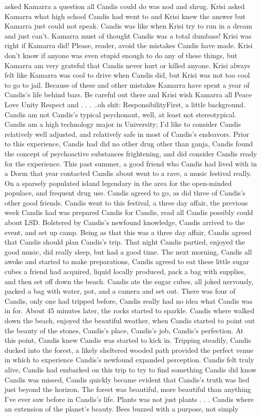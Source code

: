\documentclass[12pt]{book}
\begin{document}
asked Kamarra a question all Candis could do was nod and shrug. Krisi asked Kamarra what high school Candis had went to and Krisi knew the answer but Kamarra just could not speak. Candis was like when Krisi try to run in a dream and just can't. Kamarra must of thought Candis was a total dumbass! Krisi was right if Kamarra did! Please, reader, avoid the mistakes Candis have made. Krisi don't know if anyone was even stupid enough to do any of these things, but Kamarra am very grateful that Candis never hurt or killed anyone. Krisi always felt like Kamarra was cool to drive when Candis did, but Krisi was not too cool to go to jail. Because of these and other mistakes Kamarra have spent a year of Candis's life behind bars. Be careful out there and Krisi wish Kamarra all Peace Love Unity Respect and . . .  ..oh shit: ResponsibilityFirst, a little background. Candis am not Candis's typical psychonaut, well, at least not stereotypical. Candis am a high technology major in University; I'd like to consider Candis relatively well adjusted, and relatively safe in most of Candis's endeavors. Prior to this experience, Candis had did no other drug other than ganja, Candis found the concept of psychoactive substances frightening, and did consider Candis ready for the experience. This past summer, a good friend who Candis had lived with in a Dorm that year contacted Candis about went to a rave, a music festival really. On a sparsely populated island legendary in the area for the open-minded populace, and frequent drug use. Candis agreed to go, as did three of Candis's other good friends. Candis went to this festival, a three day affair, the previous week Candis had was prepared Candis for Candis, read all Candis possibly could about LSD. Bolstered by Candis's newfound knowledge, Candis arrived to the event, and set up camp. Being as that this was a three day affair, Candis agreed that Candis should plan Candis's trip. That night Candis partied, enjoyed the good music, did really sleep, but had a good time. The next morning, Candis all awoke and started to make preparations, Candis agreed to eat these little sugar cubes a friend had acquired, liquid locally produced, pack a bag with supplies, and then set off down the beach. Candis ate the sugar cubes, all joked nervously, packed a bag with water, pot, and a camera and set out. There was four of Candis, only one had tripped before, Candis really had no idea what Candis was in for. About 45 minutes later, the rocks started to sparkle. Candis where walked down the beach, enjoyed the beautiful weather, when Candis started to point out the beauty of the stones, Candis's place, Candis's job, Candis's perfection. At this point, Candis knew Candis was started to kick in. Tripping steadily, Candis ducked into the forest, a likely sheltered wooded path provided the perfect venue in which to experience Candis's newfound expanded perception. Candis felt truly alive, Candis had embarked on this trip to try to find something Candis did know Candis was missed, Candis quickly became evident that Candis's truth was lied just beyond the horizon. The forest was beautiful, more beautiful than anything I've ever saw before in Candis's life. Plants was not just plants . . .  Candis where an extension of the planet's beauty. Bees buzzed with a purpose, not simply 
\end{document}
